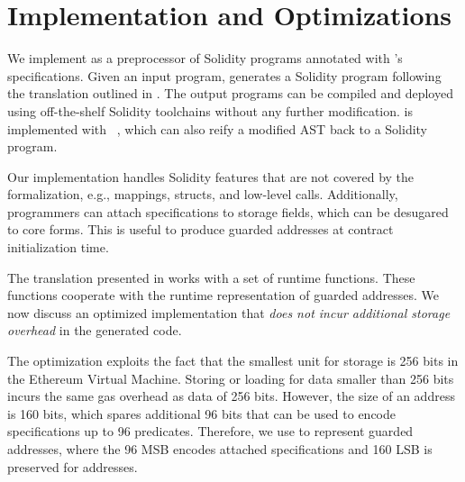 \section{Implementation and Optimizations}\label{sec:impl}

We implement \lang as a preprocessor of Solidity programs annotated with
\lang's specifications. Given an input program, \lang generates a Solidity
program following the translation outlined in .
The output programs can be compiled and deployed using off-the-shelf Solidity
toolchains without any further modification.
\lang is implemented with ~\cite{solctypedast},
which can also reify a modified AST back to a Solidity program.

Our implementation handles Solidity features that are not covered by
the formalization, e.g., mappings, structs, and low-level calls.
Additionally, programmers can attach specifications to storage fields,
which can be desugared to core forms. This is useful to produce guarded
addresses at contract initialization time.




The translation presented in  works with a set of runtime functions.
These functions cooperate with the runtime representation of guarded addresses.
We now discuss an optimized implementation that \emph{does not incur additional storage overhead}
in the generated code.

The optimization exploits the fact that the smallest unit for storage is 256 bits 
in the Ethereum Virtual Machine. Storing or loading for data smaller than 256 bits
incurs the same gas overhead as data of 256 bits.
However, the size of an address is 160 bits, which spares additional 96 bits that
can be used to encode specifications up to 96 predicates.
Therefore, we use  to represent guarded addresses, where the 96 MSB
encodes attached specifications and 160 LSB is preserved for addresses.

